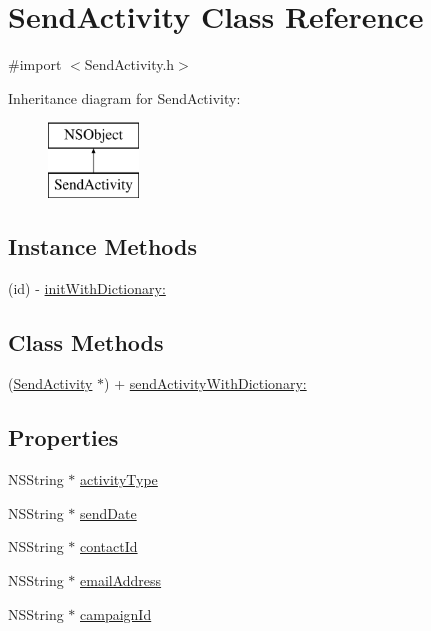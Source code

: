 \hypertarget{interface_send_activity}{\section{Send\-Activity Class Reference}
\label{interface_send_activity}
}


{\ttfamily \#import $<$Send\-Activity.\-h$>$}

Inheritance diagram for Send\-Activity\-:\begin{figure}[H]
\begin{center}
\leavevmode
\includegraphics[height=2.000000cm]{interface_send_activity}
\end{center}
\end{figure}
\subsection*{Instance Methods}
\begin{DoxyCompactItemize}
\item 
(id) -\/ \hyperlink{interface_send_activity_a4bbb8130a948894afebeba44106ef6cf}{init\-With\-Dictionary\-:}
\end{DoxyCompactItemize}
\subsection*{Class Methods}
\begin{DoxyCompactItemize}
\item 
(\hyperlink{interface_send_activity}{Send\-Activity} $\ast$) + \hyperlink{interface_send_activity_ac0ba4d4355530e716db91583af9f262d}{send\-Activity\-With\-Dictionary\-:}
\end{DoxyCompactItemize}
\subsection*{Properties}
\begin{DoxyCompactItemize}
\item 
N\-S\-String $\ast$ \hyperlink{interface_send_activity_aba7ffe5310e344713eee86712345972b}{activity\-Type}
\item 
N\-S\-String $\ast$ \hyperlink{interface_send_activity_ae36769174b1db462665442e41de83890}{send\-Date}
\item 
N\-S\-String $\ast$ \hyperlink{interface_send_activity_ab57e078a4a8c44df85190deaf79c88f0}{contact\-Id}
\item 
N\-S\-String $\ast$ \hyperlink{interface_send_activity_a145b6a27bdb02f7d6e47fef8610602a7}{email\-Address}
\item 
N\-S\-String $\ast$ \hyperlink{interface_send_activity_a196f08d02afbc58d935493c33d936b5f}{campaign\-Id}
\end{DoxyCompactItemize}



